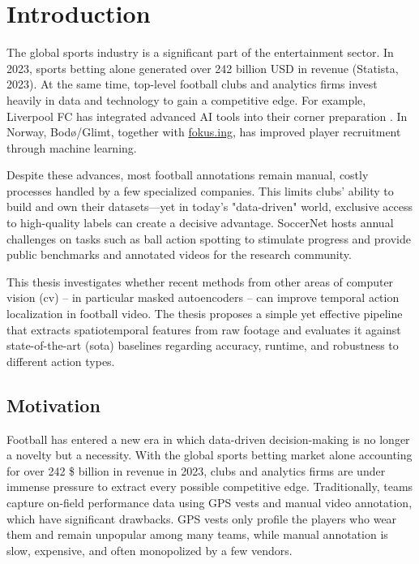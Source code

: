 \chapter{Introduction}
\label{chap:intro}

The global sports industry is a significant part of the entertainment sector. In 2023, sports betting alone generated over 242 billion USD in revenue (Statista, 2023). At the same time, top-level football clubs and analytics firms invest heavily in data and technology to gain a competitive edge. For example, Liverpool FC has integrated advanced AI tools into their corner preparation \cite{wang_tactic_ai_2024}. In Norway, Bodø/Glimt, together with \hyperlink{https://fokus.ing}{fokus.ing}, has improved player recruitment through machine learning.

Despite these advances, most football annotations remain manual, costly processes handled by a few specialized companies. This limits clubs' ability to build and own their datasets—yet in today's "data-driven" world, exclusive access to high-quality labels can create a decisive advantage. SoccerNet hosts annual challenges on tasks such as ball action spotting to stimulate progress and provide public benchmarks and annotated videos for the research community.

This thesis investigates whether recent methods from other areas of computer vision (\acrlong{cv}) – in particular masked autoencoders – can improve temporal action localization in football video. The thesis proposes a simple yet effective pipeline that extracts spatiotemporal features from raw footage and evaluates it against state-of-the-art (\acrfull{sota}) baselines regarding accuracy, runtime, and robustness to different action types.

\section{Motivation}
Football has entered a new era in which data-driven decision-making is no longer a novelty but a necessity. With the global sports betting market alone accounting for over 242 \$ billion in revenue in 2023, clubs and analytics firms are under immense pressure to extract every possible competitive edge. Traditionally, teams capture on-field performance data using GPS vests and manual video annotation, which have significant drawbacks. GPS vests only profile the players who wear them and remain unpopular among many teams, while manual annotation is slow, expensive, and often monopolized by a few vendors.  


